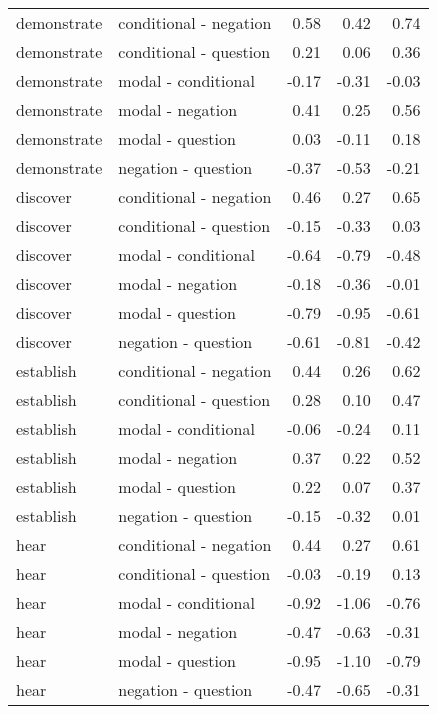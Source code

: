 \documentclass[11pt,fleqn]{article}
\newcommand{\6}{\mbox{$[\hspace*{-.6mm}[$}}
\newcommand{\9}{\mbox{$]\hspace*{-.6mm}]$}}
\begin{document}
\begin{longtable}{llrrr}
      demonstrate & conditional - negation & 0.58 & 0.42 & 0.74 \\ 
      demonstrate & conditional - question & 0.21 & 0.06 & 0.36 \\ 
      demonstrate & modal - conditional & -0.17 & -0.31 & -0.03 \\ 
      demonstrate & modal - negation & 0.41 & 0.25 & 0.56 \\ 
      demonstrate & modal - question & 0.03 & -0.11 & 0.18 \\ 
      demonstrate & negation - question & -0.37 & -0.53 & -0.21 \\ \midrule

      discover & conditional - negation & 0.46 & 0.27 & 0.65 \\ 
      discover & conditional - question & -0.15 & -0.33 & 0.03 \\ 
      discover & modal - conditional & -0.64 & -0.79 & -0.48 \\ 
      discover & modal - negation & -0.18 & -0.36 & -0.01 \\ 
      discover & modal - question & -0.79 & -0.95 & -0.61 \\ 
      discover & negation - question & -0.61 & -0.81 & -0.42 \\ \midrule

      establish & conditional - negation & 0.44 & 0.26 & 0.62 \\ 
      establish & conditional - question & 0.28 & 0.10 & 0.47 \\ 
      establish & modal - conditional & -0.06 & -0.24 & 0.11 \\ 
      establish & modal - negation & 0.37 & 0.22 & 0.52 \\ 
      establish & modal - question & 0.22 & 0.07 & 0.37 \\ 
      establish & negation - question & -0.15 & -0.32 & 0.01 \\ \midrule

      hear & conditional - negation & 0.44 & 0.27 & 0.61 \\ 
      hear & conditional - question & -0.03 & -0.19 & 0.13 \\ 
      hear & modal - conditional & -0.92 & -1.06 & -0.76 \\ 
      hear & modal - negation & -0.47 & -0.63 & -0.31 \\ 
      hear & modal - question & -0.95 & -1.10 & -0.79 \\ 
      hear & negation - question & -0.47 & -0.65 & -0.31 \\ \midrule


\end{longtable}
\end{document}
